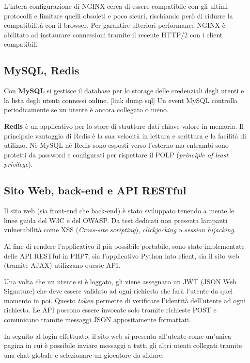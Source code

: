 L'intera configurazione di NGINX cerca di essere compatibile con gli ultimi protocolli e limitare quelli obsoleti e poco sicuri, rischiando però di ridurre la compatibilità con il browser. Per garantire ulteriori performance NGINX è abilitato ad instaurare connessioni tramite il recente HTTP/2 con i client compatibili.

\subsection{MySQL, Redis}
Con \textbf{MySQL} si gestisce il database per lo storage delle credenziali degli utenti e la lista degli utenti connessi online.
[link dump sql]
Un event MySQL controlla periodicamente se un utente è ancora collegato o meno.

\textbf{Redis} è un applicativo per lo store di strutture dati chiave-valore in memoria. Il principale vantaggio di Redis è la sua velocità in lettura e scrittura e la facilità di utilizzo.
Nè MySQL nè Redis sono esposti verso l'esterno ma entrambi sono protetti da password e configurati per rispettare il POLP (\textit{principle of least privilege}).

\subsection{Sito Web, back-end e API RESTful}
Il sito web (sia front-end che back-end) è stato sviluppato tenendo a mente le linee guida del W3C e del OWASP. Da test dedicati non presenta lampanti vulnerabilità come XSS (\textit{Cross-site scripting}), \textit{clickjacking} o \textit{session hijacking}.

Al fine di rendere l'applicativo il più possibile portabile, sono state implementate delle API RESTful in PHP7; sia l'applicativo Python lato client, sia il sito web (tramite AJAX) utilizzano queste API.

Una volta che un utente si è loggato, gli viene assegnato un JWT (JSON Web Signature) che deve essere validato ad ogni richiesta che farà l'utente da quel momento in poi. Questo \textit{token} permette di verificare l'identità dell'utente ad ogni richiesta.
Le API possono essere invocate solo tramite richieste POST e comunicano tramite messaggi JSON appositamente formattati.

In seguito al login effettuato, il sito web si presenta all'utente come un'unica pagina in cui è possibile inviare messaggi a tutti gli altri utenti collegati tramite una chat globale e selezionare un giocatore da sfidare. 

